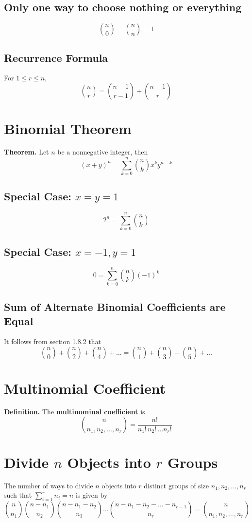 \documentclass[../st2131_notes.tex]{subfiles}
\begin{document}
\subsection{Only one way to choose nothing or everything}
\[\binom{n}{0}=\binom{n}{n}=1\]

\subsection{Recurrence Formula}
For \(1\leq r\leq n\),
\[\binom{n}{r}=\binom{n-1}{r-1}+\binom{n-1}{r}\]

\section{Binomial Theorem}
\textbf{Theorem.} Let \(n\) be a nonnegative integer, then
\[(x+y)^n=\sum_{k=0}^n\binom{n}{k}x^ky^{n-k}\]

\subsection{Special Case: $x=y=1$}
\[2^n=\sum_{k=0}^n\binom{n}{k}\]

\subsection{Special Case: $x=-1, y=1$}
\[0=\sum_{k=0}^n\binom{n}{k}(-1)^k\]

\subsection{Sum of Alternate Binomial Coefficients are Equal}
It follows from section 1.8.2 that
\[\binom{n}{0}+\binom{n}{2}+\binom{n}{4}+\ldots=\binom{n}{1}+\binom{n}{3}+\binom{n}{5}+\ldots\]

\section{Multinomial Coefficient}
\textbf{Definition.} The \textbf{multinominal coefficient} is
\[\binom{n}{n_1,n_2,\ldots,n_r}=\frac{n!}{n_1!\,n_2!\,\ldots n_r!}\]

\section{Divide $n$ Objects into $r$ Groups}
The number of ways to divide \(n\) objects into \(r\) distinct groups of size \(n_1,n_2,\ldots,n_r\) such that \(\sum\limits_{i=1}^rn_i=n\) is given by
\[\binom{n}{n_1}\binom{n-n_1}{n_2}\binom{n-n_1-n_2}{n_3}\ldots\binom{n-n_1-n_2-\ldots-n_{r-1}}{n_r}=\binom{n}{n_1,n_2,\ldots,n_r}\]
\end{document}
